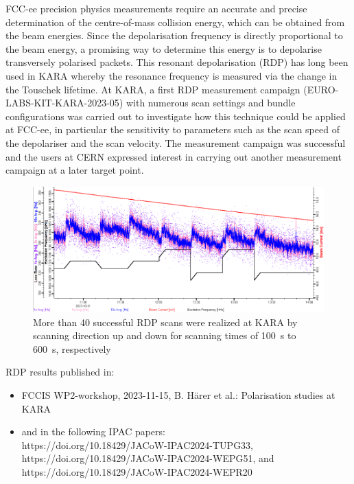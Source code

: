 FCC-ee precision physics measurements require an accurate and precise determination of the centre-of-mass collision energy, which can be obtained from the beam energies. Since the depolarisation frequency is directly proportional to the beam energy, a promising way to determine this energy is to depolarise transversely polarised packets. This resonant depolarisation (RDP) has long been used in KARA whereby the resonance frequency is measured via the change in the Touschek lifetime. At KARA, a first RDP measurement campaign (EURO-LABS-KIT-KARA-2023-05) with numerous scan settings and bundle configurations was carried out to investigate how this technique could be applied at FCC-ee, in particular the sensitivity to parameters such as the scan speed of the depolariser and the scan velocity. The measurement campaign was successful and the users at CERN expressed interest in carrying out another measurement campaign at a later target point.
\begin{figure}[H]
    \centering
    \includegraphics[width=0.75\linewidth]{graphics/wp3-KIT_RDPscans.png}
    \caption{More than 40 successful RDP scans were realized at KARA by scanning direction up and down for scanning times of \SI{100}{s} to \SI{600}{s}, respectively}    
    \label{fig:kit_rdp}
\end{figure}

RDP results published in:
\begin{itemize}
\item FCCIS WP2-workshop, 2023-11-15, B. Härer et al.: Polarisation studies at KARA
\item and in the following IPAC papers: \\ https://doi.org/10.18429/JACoW-IPAC2024-TUPG33, \\ https://doi.org/10.18429/JACoW-IPAC2024-WEPG51, and \\ https://doi.org/10.18429/JACoW-IPAC2024-WEPR20
\end{itemize}

